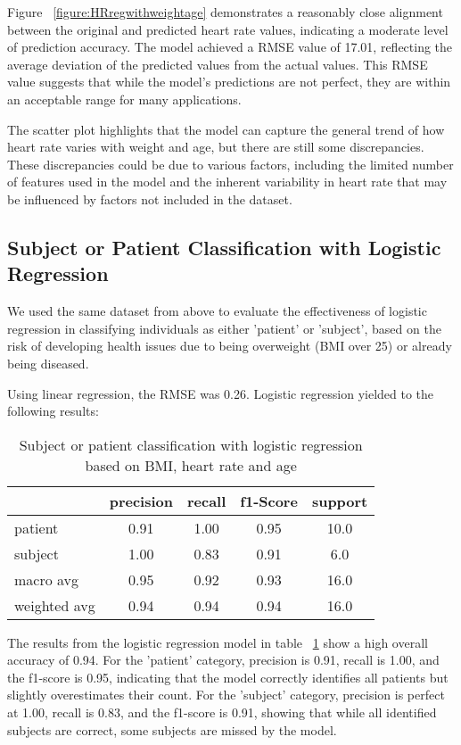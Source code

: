 Figure ~\ref{figure:HRregwithweightage} demonstrates a reasonably close alignment between the original and predicted heart rate values, indicating a moderate level of prediction accuracy. The model achieved a RMSE value of 17.01, reflecting the average deviation of the predicted values from the actual values. This RMSE value suggests that while the model's predictions are not perfect, they are within an acceptable range for many applications.

The scatter plot highlights that the model can capture the general trend of how heart rate varies with weight and age, but there are still some discrepancies. These discrepancies could be due to various factors, including the limited number of features used in the model and the inherent variability in heart rate that may be influenced by factors not included in the dataset.

\subsection{Subject or Patient Classification with Logistic Regression}

We used the same dataset from above to evaluate the effectiveness of logistic regression in classifying individuals as either 'patient' or 'subject', based on the risk of developing health issues due to being overweight (BMI over 25) or already being diseased.

Using linear regression, the RMSE was 0.26. Logistic regression yielded to the following results:

\FloatBarrier
\begin{table}[H]
\centering
\begin{tabular}{lcccc}
\toprule
& precision & recall & f1-Score & support \\
\midrule
patient & 0.91 & 1.00 & 0.95 & 10.0 \\
subject & 1.00 & 0.83 & 0.91 & 6.0 \\
macro avg & 0.95 & 0.92 & 0.93 & 16.0 \\
weighted avg & 0.94 & 0.94 & 0.94 & 16.0 \\
\bottomrule
\end{tabular}
\caption{Subject or patient classification with logistic regression based on BMI, heart rate and age}
\label{table:logregpatsubj}
\end{table}
\FloatBarrier

The results from the logistic regression model in table ~\ref{table:logregpatsubj} show a high overall accuracy of 0.94. For the 'patient' category, precision is 0.91, recall is 1.00, and the f1-score is 0.95, indicating that the model correctly identifies all patients but slightly overestimates their count. For the 'subject' category, precision is perfect at 1.00, recall is 0.83, and the f1-score is 0.91, showing that while all identified subjects are correct, some subjects are missed by the model.


